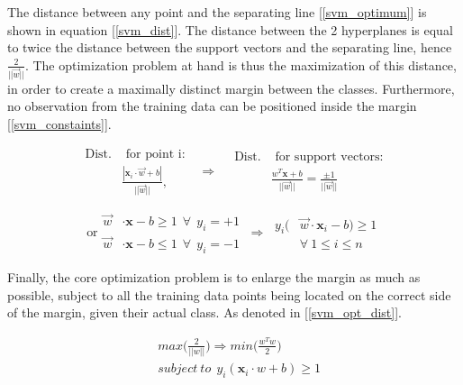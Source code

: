 	The distance between any point and the separating line [\ref{svm_optimum}] is shown in equation [\ref{svm_dist}]. The distance between the 2 hyperplanes is equal to twice the distance between the support vectors and the separating line, hence $ \frac{2}{||\vec{w}||} $. The optimization problem at hand is thus the maximization of this distance, in order to create a maximally distinct margin between the classes. Furthermore, no observation from the training data can be positioned inside the margin [\ref{svm_constaints}].
	
	\begin{equation}
		\begin{aligned}
			\text{Dist.}&\text{ for point i}: \\ 
			&\frac{| \textbf{x}_i \cdot \vec{w} + b|}{||\vec{w}||},
		\end{aligned}
		\ \ \ \Rightarrow 	\ \ \ \ 
		\begin{aligned}
			\text{Dist.}&\text{ for support vectors:} \\
			&\frac{w^T\textbf{x} + b}{||\vec{w}||} = \frac{\pm 1}{||\vec{w}||}
		\end{aligned}
		\label{svm_dist}
	\end{equation}
	
	\begin{equation}
		\text{or}
		\begin{aligned}
			\vec{w}& \cdot \textbf{x} - b \geq 1 \ \ \forall \ \  y_i = +1 \\
			\vec{w}& \cdot \textbf{x} - b \leq 1 \ \ \forall \ \  y_i = -1
			\end{aligned}	
			\ \Rightarrow \ 
			\begin{aligned}
			y_i(&\vec{w} \cdot \textbf{x}_i - b) \geq 1 \\
			&\forall \ 1 \leq i \leq n
		\end{aligned}
		\label{svm_constaints}
	\end{equation}
	
	Finally, the core optimization problem is to enlarge the margin as much as possible, subject to all the training data points being located on the correct side of the margin, given their actual class. As denoted in [\ref{svm_opt_dist}].
	
	\begin{equation}
		\begin{aligned}
			&max \Bigg(\frac{2}{||w||}\Bigg) \Rightarrow 
			min \Bigg( \frac{w^Tw}{2}	\Bigg)\\
			&subject \  to \ \ y_i(\textbf{x}_i \cdot w + b) \geq 1
		\end{aligned}
		\label{svm_opt_dist}
	\end{equation}
	
